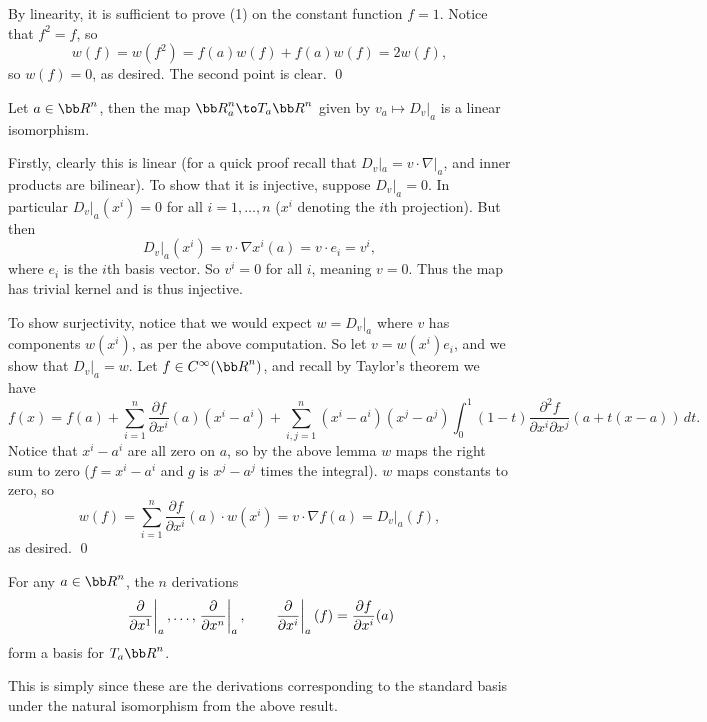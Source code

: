 \elemm

\bproof

    By linearity, it is sufficient to prove (1) on the constant function $f=1$.
    Notice that $f^2=f$, so
    $$ w(f) = w(f^2) = f(a)w(f) + f(a)w(f) = 2w(f), $$
    so $w(f)=0$, as desired.
    The second point is clear.
    \qed

\eproof

\bprop

    Let $a\in\bR^n$, then the map $\bR^n_a\to T_a\bR^n$ given by $v_a\mapsto D_v|_a$ is a linear isomorphism.

\eprop

\bproof

    Firstly, clearly this is linear (for a quick proof recall that $D_v|_a=v\cdot\nabla|_a$, and inner products are bilinear).
    To show that it is injective, suppose $D_v|_a=0$.
    In particular $D_v|_a(x^i)=0$ for all $i=1,\dots,n$ ($x^i$ denoting the $i$th projection).
    But then
    $$ D_v|_a(x^i) = v\cdot\nabla x^i(a) = v\cdot e_i = v^i , $$
    where $e_i$ is the $i$th basis vector.
    So $v^i=0$ for all $i$, meaning $v=0$.
    Thus the map has trivial kernel and is thus injective.

    To show surjectivity, notice that we would expect $w=D_v|_a$ where $v$ has components $w(x^i)$, as per the above computation.
    So let $v=w(x^i)e_i$, and we show that $D_v|_a=w$.
    Let $f\in C^\infty(\bR^n)$, and recall by Taylor's theorem we have
    $$ f(x) = f(a) + \sum_{i=1}^n\frac{\partial f}{\partial x^i}(a)(x^i-a^i) +
    \sum_{i,j=1}^n(x^i-a^i)(x^j-a^j)\int_0^1(1-t)\frac{\partial^2f}{\partial x^i\partial x^j}(a+t(x-a))\,dt . $$
    Notice that $x^i-a^i$ are all zero on $a$, so by the above lemma $w$ maps the right sum to zero ($f=x^i-a^i$ and $g$ is $x^j-a^j$
    times the integral).
    $w$ maps constants to zero, so
    $$ w(f) = \sum_{i=1}^n \frac{\partial f}{\partial x^i}(a)\cdot w(x^i) = v\cdot\nabla f(a) = D_v|_a(f) , $$
    as desired.
    \qed

\eproof

\bcoro

    For any $a\in\bR^n$, the $n$ derivations
    $$ \left.{{\partial}\over{\partial x^1}}\right|_a,\dots,\left.{{\partial}\over{\partial x^n}}\right|_a,\qquad \left.{{\partial}\over{\partial x^i}}\right|_a(f) = {{\partial f}\over{\partial x^i}}(a) $$
    form a basis for $T_a\bR^n$.

\ecoro

This is simply since these are the derivations corresponding to the standard basis under the natural isomorphism from the above result.

